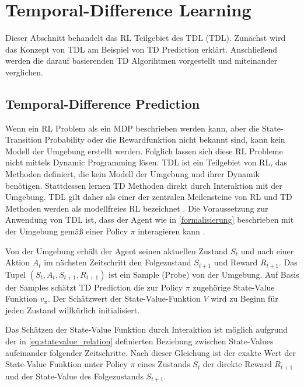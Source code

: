 \section{Temporal-Difference Learning}
Dieser Abschnitt behandelt das \ac{RL} Teilgebiet des \acl{TDL} (\ac{TDL}).
Zunächst wird das Konzept von \ac{TDL} am Beispiel von \ac{TD} Prediction erklärt. 
Anschließend werden die darauf basierenden \ac{TD} Algorihtmen \bothAlgs vorgestellt und miteinander verglichen.

\subsection{Temporal-Difference Prediction}
\label{sec:td_prediction}

Wenn ein \ac{RL} Problem als ein \ac{MDP} beschrieben werden kann, aber die State-Transition Probability oder die Rewardfunktion nicht bekannt sind, kann kein Modell der Umgebung erstellt werden. 
Folglich lassen sich diese \ac{RL} Probleme nicht mittels Dynamic Programming lösen. 
\ac{TDL} ist ein Teilgebiet von \ac{RL}, das Methoden definiert, die kein Modell der Umgebung und ihrer Dynamik benötigen. 
Stattdessen lernen \ac{TD} Methoden direkt durch Interaktion mit der Umgebung.
\ac{TDL} gilt daher als einer der zentralen Meilensteine von \ac{RL} und \ac{TD} Methoden werden als modellfreies RL bezeichnet \cite[S. 119]{suttonReinforcementLearningIntroduction2018}.
Die Voraussetzung zur Anwendung von \ac{TDL} ist, dass der Agent wie in \cref{formalisierung} beschrieben mit der Umgebung gemäß einer Policy $\pi$ interagieren kann \cite[S.88, S. 94]{kontesg.SeminarReinforcementLearning2021}. 

Von der Umgebung erhält der Agent seinen aktuellen Zustand $S_t$ und nach einer Aktion $A_t$ im nächsten Zeitschritt den Folgezustand $S_{t+1}$ und Reward $R_{t+1}$. 
Das Tupel $(S_t, A_t, S_{t+1}, R_{t+1})$ ist ein Sample (\dt Probe) von der Umgebung. 
Auf Basis der Samples schätzt \ac{TD} Prediction die zur Policy $\pi$ zugehörige State-Value Funktion $v_\pi$.
Der Schätzwert der State-Value-Funktion $V$ wird zu Beginn für jeden Zustand willkürlich initialisiert. \cite[S. 120f.]{suttonReinforcementLearningIntroduction2018}

Das Schätzen der State-Value Funktion durch Interaktion ist möglich aufgrund der in \cref{eq:statevalue_relation} definierten Beziehung zwischen State-Values aufeinander folgender Zeitschritte. 
Nach dieser Gleichung ist der exakte Wert der State-Value Funktion unter Policy $\pi$ eines Zustands $S_t$ der direkte Reward $R_{t+1}$ und der State-Value des Folgezustands $S_{t+1}$. \cite[S. 120f.]{suttonReinforcementLearningIntroduction2018}

